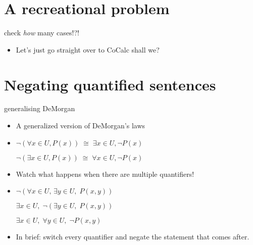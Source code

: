 \documentclass[landscape]{beamer}
\begin{document}
\section{A recreational problem}

\begin{frame}{check {\em how} many cases!?!}
\begin{itemize}
\item Let's just go straight over to CoCalc shall we?
\end{itemize}
\end{frame}

\section{Negating quantified sentences}

\begin{frame}{generalising DeMorgan}
\begin{itemize}
\item A generalized version of DeMorgan's laws\pause
\item \rule[-6pt]{0pt}{24pt} $ \lnot ( \forall x \in U, P(x)) \; \cong \; \exists x \in U, \lnot P(x) $\pause \newline
 \rule[-6pt]{0pt}{24pt} $ \lnot ( \exists x \in U, P(x)) \; \cong \; \forall x \in U, \lnot P(x) $\pause
\item Watch what happens when there are multiple quantifiers!\pause
\item \rule[-6pt]{0pt}{24pt} $ \lnot ( \forall x \in U, \, \exists y \in U, \; P(x,y) )$ \pause \newline
\rule[-6pt]{0pt}{24pt} $ \exists x \in U, \; \lnot ( \exists y \in U, \; P(x,y) )$ \pause \newline
\rule[-6pt]{0pt}{24pt} $ \exists x \in U, \; \forall y \in U, \; \lnot P(x,y) $ \pause
\item In brief: switch every quantifier and negate the statement that comes after.
\end{itemize}
\end{frame}
\end{document}
